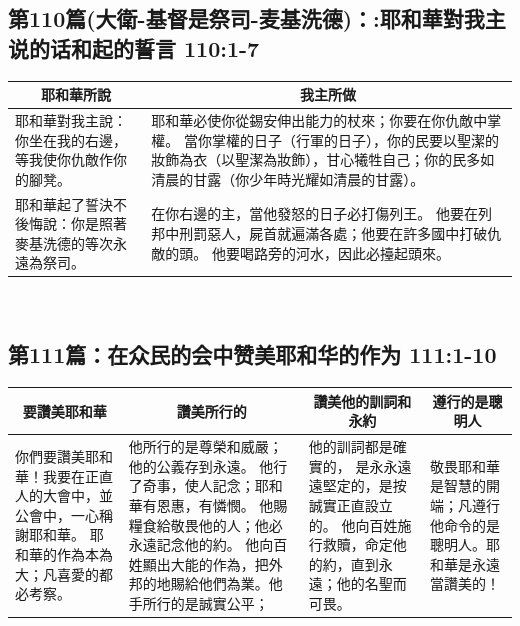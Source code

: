 \subsection{第110篇(大衛-基督是祭司-麦基洗德)：:耶和華對我主说的话和起的誓言 110:1-7}
\begin{table}[H]
\centering
\begin{tabular}{p{5.25cm}|p{12.2500cm}}\hline\hline
\multicolumn{1}{c|}{耶和華所說}&\multicolumn{1}{c}{我主所做}\\\hline
耶和華對我主說：你坐在我的右邊，等我使你仇敵作你的腳凳。
&耶和華必使你從錫安伸出能力的杖來；你要在你仇敵中掌權。
當你掌權的日子（行軍的日子），你的民要以聖潔的妝飾為衣（以聖潔為妝飾），甘心犧牲自己；你的民多如清晨的甘露（你少年時光耀如清晨的甘露）。\\\hline
耶和華起了誓決不後悔說：你是照著麥基洗德的等次永遠為祭司。
&在你右邊的主，當他發怒的日子必打傷列王。
他要在列邦中刑罰惡人，屍首就遍滿各處；他要在許多國中打破仇敵的頭。
他要喝路旁的河水，因此必擡起頭來。\\\hline
\end{tabular}
\end{table} 







\subsection{第111篇：在众民的会中赞美耶和华的作为 111:1-10}
\begin{table}[H]
\hspace{-1.5cm}
\centering
\begin{tabular}{p{3.75cm}|p{6.900cm}|p{4.00cm}|p{2.500cm}}\hline\hline
\multicolumn{1}{c|}{要讚美耶和華}&\multicolumn{1}{c|}{讚美所行的}&\multicolumn{1}{c|}{讚美他的訓詞和永約}&\multicolumn{1}{c}{遵行的是聰明人}\\\hline
你們要讚美耶和華！我要在正直人的大會中，並公會中，一心稱謝耶和華。
耶和華的作為本為大；凡喜愛的都必考察。
&他所行的是尊榮和威嚴；他的公義存到永遠。
他行了奇事，使人記念；耶和華有恩惠，有憐憫。
他賜糧食給敬畏他的人；他必永遠記念他的約。
他向百姓顯出大能的作為，把外邦的地賜給他們為業。他手所行的是誠實公平；
&他的訓詞都是確實的，
是永永遠遠堅定的，是按誠實正直設立的。
他向百姓施行救贖，命定他的約，直到永遠；他的名聖而可畏。
&敬畏耶和華是智慧的開端；凡遵行他命令的是聰明人。耶和華是永遠當讚美的！\\\hline
\end{tabular}
\end{table} 


